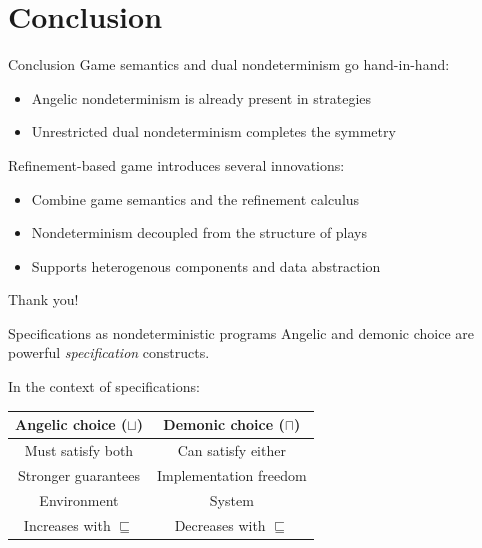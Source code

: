 \documentclass[aspectratio=54]{beamer}
\begin{document}

\section*{Conclusion} %

\begin{frame}{Conclusion}
  Game semantics and dual nondeterminism go hand-in-hand:
  \begin{itemize}
    \item Angelic nondeterminism is already present in strategies
    \item Unrestricted dual nondeterminism completes the symmetry
  \end{itemize}

  Refinement-based game introduces several innovations:
  \begin{itemize}
    \item Combine game semantics and the refinement calculus
    \item Nondeterminism decoupled from the structure of plays
    \item Supports heterogenous components and data abstraction
  \end{itemize}
\end{frame}


\begin{frame}{}
  \begin{center}
    Thank you!
  \end{center}
\end{frame}


\appendix %

\begin{frame}{Specifications as nondeterministic programs} %
  Angelic and demonic choice are powerful
  \emph{specification} constructs.

  \pause
  In the context of specifications:
  \begin{center}
    \begin{tabular}{cc}
      \hline
      Angelic choice ($\sqcup$) & Demonic choice ($\sqcap$) \\
      \hline
      Must satisfy both & Can satisfy either \\
      Stronger guarantees & Implementation freedom \\
      Environment & System \\
      Increases with $\sqsubseteq$ & Decreases with $\sqsubseteq$ \\
      \hline
    \end{tabular}
  \end{center}
\end{frame}
\end{document}
